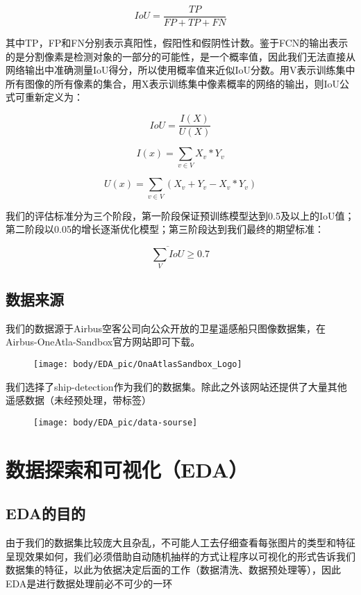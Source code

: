 \[IoU = \frac{TP}{FP+TP+FN}\]

其中TP，FP和FN分别表示真阳性，假阳性和假阴性计数。鉴于FCN的输出表示的是分割像素是检测对象的一部分的可能性，是一个概率值，因此我们无法直接从网络输出中准确测量IoU得分，所以使用概率值来近似IoU分数。用V表示训练集中所有图像的所有像素的集合，用X表示训练集中像素概率的网络的输出，则IoU公式可重新定义为：

\[IoU = \frac{I(X)}{U(X)}\]

\[I(x) = \sum_{v\in V}X_v * Y_v\]

\[U(x) = \sum_{v\in V}(X_v + Y_v - X_v * Y_v)\]

我们的评估标准分为三个阶段，第一阶段保证预训练模型达到0.5及以上的IoU值；第二阶段以0.05的增长逐渐优化模型；第三阶段达到我们最终的期望标准：

\[\overline{\sum_V IoU}\geq0.7\]

\section{数据来源}\label{ux6570ux636eux6765ux6e90}

我们的数据源于Airbus空客公司向公众开放的卫星遥感船只图像数据集，在Airbus-OneAtla-Sandbox官方网站即可下载。

\begin{figure}[htbp]
\centering
\texttt{[image: body/EDA\_pic/OnaAtlasSandbox\_Logo]}
\caption{}
\end{figure}

我们选择了ship-detection作为我们的数据集。除此之外该网站还提供了大量其他遥感数据（未经预处理，带标签）

\begin{figure}[htbp]
\centering
\texttt{[image: body/EDA\_pic/data-sourse]}
\caption{}
\end{figure}

\chapter{数据探索和可视化（EDA）}\label{ux6570ux636eux63a2ux7d22ux548cux53efux89c6ux5316eda}

\section{EDA的目的}\label{edaux7684ux76eeux7684}

由于我们的数据集比较庞大且杂乱，不可能人工去仔细查看每张图片的类型和特征呈现效果如何，我们必须借助自动随机抽样的方式让程序以可视化的形式告诉我们数据集的特征，以此为依据决定后面的工作（数据清洗、数据预处理等），因此EDA是进行数据处理前必不可少的一环

